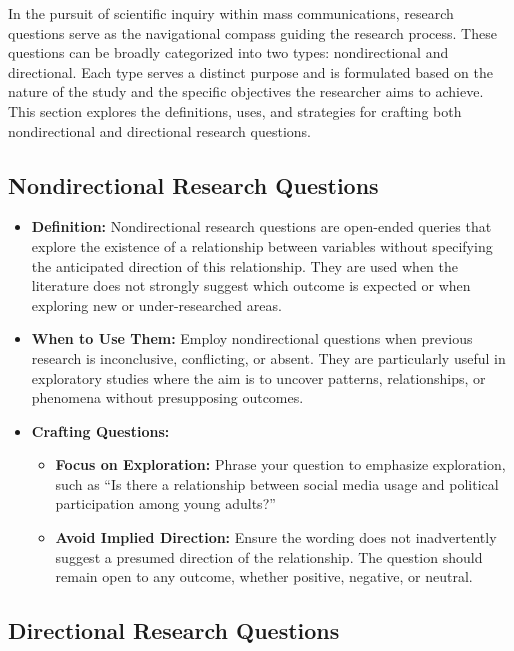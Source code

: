 \documentclass[
]{book}
\providecommand{\tightlist}{%
  \setlength{\itemsep}{0pt}\setlength{\parskip}{0pt}}
\begin{document}
In the pursuit of scientific inquiry within mass communications, research questions serve as the navigational compass guiding the research process. These questions can be broadly categorized into two types: nondirectional and directional. Each type serves a distinct purpose and is formulated based on the nature of the study and the specific objectives the researcher aims to achieve. This section explores the definitions, uses, and strategies for crafting both nondirectional and directional research questions.

\hypertarget{nondirectional-research-questions}{%
\subsection*{Nondirectional Research Questions}\label{nondirectional-research-questions}}

\begin{itemize}
\item
  \textbf{Definition:} Nondirectional research questions are open-ended queries that explore the existence of a relationship between variables without specifying the anticipated direction of this relationship. They are used when the literature does not strongly suggest which outcome is expected or when exploring new or under-researched areas.
\item
  \textbf{When to Use Them:} Employ nondirectional questions when previous research is inconclusive, conflicting, or absent. They are particularly useful in exploratory studies where the aim is to uncover patterns, relationships, or phenomena without presupposing outcomes.
\item
  \textbf{Crafting Questions:}

  \begin{itemize}
  \tightlist
  \item
    \textbf{Focus on Exploration:} Phrase your question to emphasize exploration, such as ``Is there a relationship between social media usage and political participation among young adults?''
  \item
    \textbf{Avoid Implied Direction:} Ensure the wording does not inadvertently suggest a presumed direction of the relationship. The question should remain open to any outcome, whether positive, negative, or neutral.
  \end{itemize}
\end{itemize}

\hypertarget{directional-research-questions}{%
\subsection*{Directional Research Questions}\label{directional-research-questions}}
\end{document}
